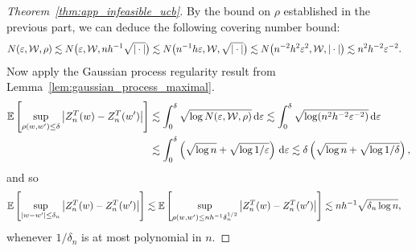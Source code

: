 \begin{proof}[Theorem~\ref{thm:app_infeasible_ucb}]
  By the bound on $\rho$ established in the previous part,
  we can deduce the following covering number bound:
  \begin{align*}
    N(\varepsilon, \mathcal{W}, \rho)
    &\lesssim
    N\big(
    \varepsilon,
    \mathcal{W},
    n h^{-1} \sqrt{|\cdot|}
    \big)
    \lesssim
    N\big(
    n^{-1} h \varepsilon,
    \mathcal{W},
    \sqrt{|\cdot|}
    \big)
    \lesssim
    N\big(
    n^{-2} h^2 \varepsilon^2,
    \mathcal{W},
    |\cdot|
    \big)
    \lesssim
    n^2 h^{-2} \varepsilon^{-2}.
  \end{align*}
  Now apply the Gaussian process regularity result from
  Lemma~\ref{lem:gaussian_process_maximal}.
  \begin{align*}
    \mathbb{E}\left[
      \sup_{\rho(w,w') \leq \delta}
      \big| Z_n^T(w) - Z_n^T(w') \big|
    \right]
    &\lesssim
    \int_0^{\delta}
    \sqrt{\log N(\varepsilon, \mathcal{W}, \rho)}
    \,\mathrm{d}\varepsilon
    \lesssim
    \int_0^{\delta}
    \sqrt{\log (n^2 h^{-2} \varepsilon^{-2})}
    \,\mathrm{d}\varepsilon \\
    &\lesssim
    \int_0^{\delta}
    \left(
      \sqrt{\log n}
      + \sqrt{\log 1/\varepsilon}
    \right)
    \,\mathrm{d}\varepsilon
    \lesssim
    \delta
    \left(
      \sqrt{\log n}
      + \sqrt{\log 1/\delta}
    \right),
  \end{align*}
  and so
  \begin{align*}
    \mathbb{E}\left[
      \sup_{|w-w'| \leq \delta_n}
      \big| Z_n^T(w) - Z_n^T(w') \big|
    \right]
    &\lesssim
    \mathbb{E}\left[
      \sup_{\rho(w,w') \leq n h^{-1} \delta_n^{1/2}}
      \big| Z_n^T(w) - Z_n^T(w') \big|
    \right]
    \lesssim
    n h^{-1}
    \sqrt{\delta_n \log n},
  \end{align*}
  whenever $1/\delta_n$
  is at most polynomial in $n$.



\end{proof}
